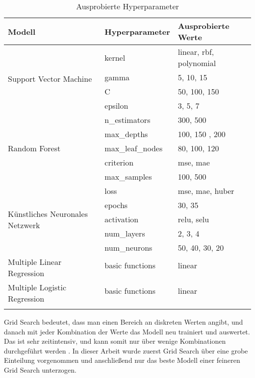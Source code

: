 \begin{table}[ht]
  \caption{\label{tab:hyperparameter} Ausprobierte Hyperparameter}
  \begin{tabular}{ p{4cm}  p{4cm}  p{5cm} }
    \toprule
    Modell & Hyperparameter  & Ausprobierte Werte \\
    \midrule
    \multirow{4}{7em}{Support Vector Machine} & kernel & linear, rbf, polynomial \\
    & gamma & 5, 10, 15 \\
    & C  & 50, 100, 150  \\
    & epsilon & 3, 5, 7  \\
    \midrule
    \multirow{5}{7em}{Random Forest} & n\_estimators & 300, 500 \\
    & max\_depths & 100, 150 , 200 \\
    & max\_leaf\_nodes & 80, 100, 120 \\
    & criterion & mse, mae \\
    & max\_samples & 100, 500 \\
    \midrule
    \multirow{5}{7em}{K\"unstliches Neuronales Netzwerk} & loss & mse, mae, huber \\
    & epochs & 30, 35 \\
    & activation & relu, selu \\
    & num\_layers & 2, 3, 4 \\
    & num\_neurons & 50, 40, 30, 20 \\
    \midrule
    \multirow{2}{7em}{Multiple Linear Regression} & basic functions & linear\\
    & & \\
    \midrule
    \multirow{2}{7em}{Multiple Logistic Regression} & basic functions & linear\\
    & & \\
    & & \\
    \bottomrule
    
  \end{tabular}
  
\end{table}

\noindent Grid Search bedeutet, dass man einen Bereich an diskreten Werten angibt, und danach mit jeder Kombination der Werte das Modell neu trainiert und auswertet.
Das ist sehr zeitintensiv, und kann somit nur \"uber wenige Kombinationen durchgef\"uhrt werden \cite{handson}. In dieser Arbeit wurde zuerst Grid Search \"uber eine grobe Einteilung 
vorgenommen und anschlie{\ss}end nur das beste Modell einer feineren Grid Search unterzogen. \\




